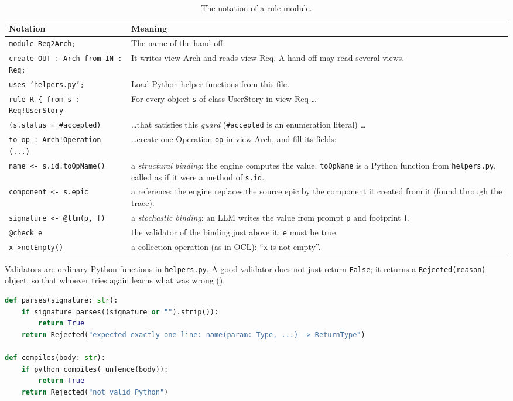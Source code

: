 \documentclass[10pt,a4paper]{article}
\newcommand{\cls}[1]{\textsf{#1}}
\newcommand{\code}[1]{\texttt{#1}}
\newcommand{\file}[1]{\texttt{#1}}
\begin{document}
\begin{table}[!htb]
\centering\small
\caption{The notation of a rule module.}
\label{tab:syntax}
\begin{tabularx}{\textwidth}{@{}L{4.6cm} Y@{}}
\toprule
Notation & Meaning \\
\midrule
\code{module Req2Arch;} & The name of the hand-off. \\
\code{create OUT : Arch from IN : Req;} & It writes view \cls{Arch} and reads view \cls{Req}. A hand-off may read several views. \\
\code{uses 'helpers.py';} & Load Python helper functions from this file. \\
\code{rule R \{ from s : Req!UserStory} & For every object \code{s} of class \cls{UserStory} in view \cls{Req} \ldots \\
\code{(s.status = \#accepted)} & \ldots that satisfies this \emph{guard} (\code{\#accepted} is an enumeration literal) \ldots \\
\code{to op : Arch!Operation (...)} & \ldots create one \cls{Operation} \code{op} in view \cls{Arch}, and fill its fields: \\
\code{name <- s.id.toOpName()} & a \emph{structural binding}: the engine computes the value. \code{toOpName} is a Python function from \file{helpers.py}, called as if it were a method of \code{s.id}. \\
\code{component <- s.epic} & a reference: the engine replaces the source epic by the component it created from it (found through the trace). \\
\code{signature <- @llm(p, f)} & a \emph{stochastic binding}: an LLM writes the value from prompt \code{p} and footprint \code{f}. \\
\code{@check e} & the validator of the binding just above it; \code{e} must be true. \\
\code{x->notEmpty()} & a collection operation (as in OCL): ``\code{x} is not empty''. \\
\bottomrule
\end{tabularx}
\end{table}

Validators are ordinary Python functions in \file{helpers.py}. A good
validator does not just return \code{False}; it returns a
\code{Rejected(reason)} object, so that whoever tries again learns what was
wrong ().

\begin{lstlisting}[language=Python, style=model, caption={Code excerpt: \file{templates/devteam/rules/helpers.py} (abridged).}, label={lst:helpers}]
def parses(signature: str):
    if signature_parses((signature or "").strip()):
        return True
    return Rejected("expected exactly one line: name(param: Type, ...) -> ReturnType")

def compiles(body: str):
    if python_compiles(_unfence(body)):
        return True
    return Rejected("not valid Python")
\end{lstlisting}
\end{document}
